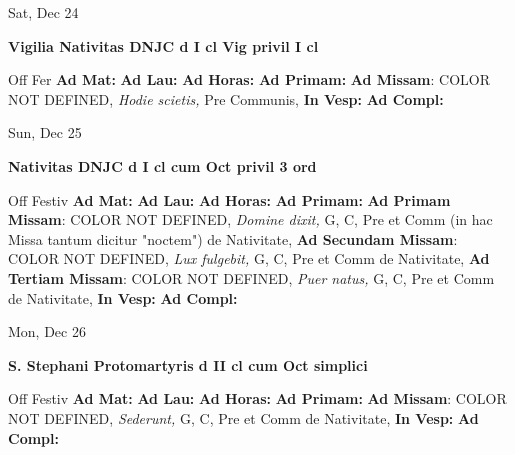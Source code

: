 \documentclass[10pt]{memoir}
\begin{document}
\begin{center}
\begin{minipage}{3.5in}
\vspace{2em}
\begin{center}Sat, Dec 24
\end{center}
\textbf{ \large Vigilia Nativitas DNJC
\textnormal{\normalsize d I cl Vig privil I cl}}

\begin{justify}Off Fer
\textbf{Ad Mat: }
\textbf{Ad Lau: }
\textbf{Ad Horas: }
\textbf{Ad Primam: }\textbf{Ad Missam}: COLOR NOT DEFINED, \textit{Hodie scietis,} Pre Communis, 
\textbf{In Vesp: }
\textbf{Ad Compl: }
\end{justify}
\end{minipage}
\end{center}

\begin{center}
\begin{minipage}{3.5in}
\vspace{2em}
\begin{center}Sun, Dec 25
\end{center}
\textbf{ \large Nativitas DNJC
\textnormal{\normalsize d I cl cum Oct privil 3 ord}}

\begin{justify}Off Festiv
\textbf{Ad Mat: }
\textbf{Ad Lau: }
\textbf{Ad Horas: }
\textbf{Ad Primam: }\textbf{Ad Primam Missam}: COLOR NOT DEFINED, \textit{Domine dixit,} G, C, Pre et Comm (in hac Missa tantum dicitur "noctem") de Nativitate, \textbf{Ad Secundam Missam}: COLOR NOT DEFINED, \textit{Lux fulgebit,} G, C, Pre et Comm de Nativitate, \textbf{Ad Tertiam Missam}: COLOR NOT DEFINED, \textit{Puer natus,} G, C, Pre et Comm de Nativitate, 
\textbf{In Vesp: }
\textbf{Ad Compl: }
\end{justify}
\end{minipage}
\end{center}

\begin{center}
\begin{minipage}{3.5in}
\vspace{2em}
\begin{center}Mon, Dec 26
\end{center}
\textbf{ \large S. Stephani Protomartyris
\textnormal{\normalsize d II cl cum Oct simplici}}

\begin{justify}Off Festiv
\textbf{Ad Mat: }
\textbf{Ad Lau: }
\textbf{Ad Horas: }
\textbf{Ad Primam: }\textbf{Ad Missam}: COLOR NOT DEFINED, \textit{Sederunt,} G, C, Pre et Comm de Nativitate, 
\textbf{In Vesp: }
\textbf{Ad Compl: }
\end{justify}
\end{minipage}
\end{center}
\end{document}
